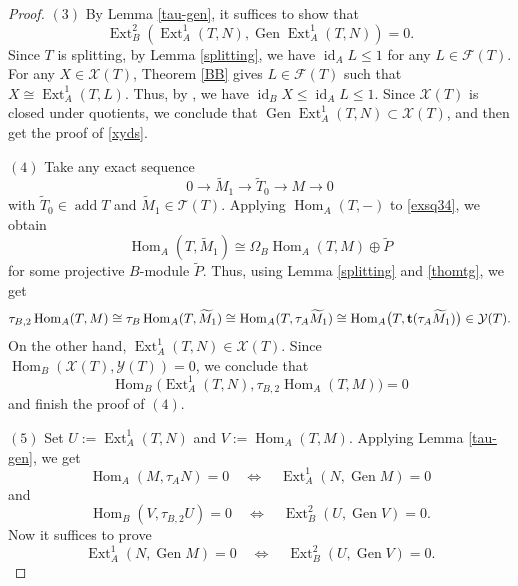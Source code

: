 \documentclass[reqno,12pt]{amsart}
\numberwithin{equation}{section}
\theoremstyle{plain}
\theoremstyle{definition}
\begin{document}
\begin{proof}
\par\medskip\noindent
$(3)$ By Lemma \ref{tau-gen}, it suffices to show that
\begin{equation}\label{xyds}
\operatorname{Ext}_B^2(\operatorname{Ext}_A^1(T, N), \operatorname{Gen}\operatorname{Ext}_A^1(T, N)) = 0.\end{equation}
Since $T$ is splitting, by Lemma \ref{splitting}, we have
$\operatorname{id}_A L\leq1$ for any $L\in\mathcal F(T)$.
For any $X\in\mathcal X(T)$, Theorem \ref{BB} gives
$L\in\mathcal F(T)$ such that
$X\cong\operatorname{Ext}_A^1(T,L)$. Thus, by \cite[VI, Exercise 20(c)]{ASS}, we have
\(\operatorname{id}_B X\leq\operatorname{id}_A L\leq1\). Since $\mathcal{X}(T)$ is closed under quotients, we conclude that
$\operatorname{Gen}\operatorname{Ext}_A^1(T, N) \subset \mathcal{X}(T)$, and then get the proof of \eqref{xyds}.


\par\medskip\noindent
$(4)$ Take any exact sequence
\begin{equation}\label{exsq34}
0\longrightarrow\widetilde M_1
\longrightarrow\widetilde T_0
\longrightarrow M
\longrightarrow0\end{equation}
with $\widetilde T_0\in\operatorname{add}T$ and
$\widetilde M_1\in\mathcal{T}(T)$. Applying
$\operatorname{Hom}_A(T,-)$ to \eqref{exsq34}, we obtain
\[
\operatorname{Hom}_A(T,\widetilde M_1)
\cong
\Omega_B\operatorname{Hom}_A(T,M)\oplus\widetilde P
\] for some projective $B$-module
$\widetilde P$.
Thus, using Lemma \ref{splitting} and \eqref{thomtg}, we get
\begin{align*}
\tau_{B,2}\operatorname{Hom}_A(T,M)
\cong
\tau_B\operatorname{Hom}_A(T,\widetilde M_1)
\cong
\operatorname{Hom}_A(T,\tau_A\widetilde M_1)
\cong
\operatorname{Hom}_A
 \bigl(T,{\bf t}(\tau_A\widetilde M_1)\bigr)
\in\mathcal{Y}(T).
\end{align*}
On the other hand,
$\operatorname{Ext}_A^1(T,N)\in\mathcal{X}(T)$. Since
$\operatorname{Hom}_B(\mathcal{X}(T),\mathcal{Y}(T))=0$, we conclude that
\[
\operatorname{Hom}_B
 \bigl(\operatorname{Ext}_A^1(T,N),
       \tau_{B,2}\operatorname{Hom}_A(T,M)\bigr)=0
\]
and finish the proof of $(4)$.


\par\medskip\noindent
$(5)$ Set $U:=\operatorname{Ext}_A^1(T,N)$ and
$V:=\operatorname{Hom}_A(T,M)$. Applying Lemma \ref{tau-gen}, we get
\[
\operatorname{Hom}_A(M,\tau_A N)=0
\quad\Longleftrightarrow\quad
\operatorname{Ext}_A^1(N,\operatorname{Gen}M)=0
\]
and
\[
\operatorname{Hom}_B(V,\tau_{B,2}U)=0
\quad\Longleftrightarrow\quad
\operatorname{Ext}_B^2(U,\operatorname{Gen}V)=0.
\]
Now it  suffices to prove
\[
\operatorname{Ext}_A^1(N,\operatorname{Gen}M)=0
\quad\Longleftrightarrow\quad
\operatorname{Ext}_B^2(U,\operatorname{Gen}V)=0.
\]


\end{proof}
\end{document}
